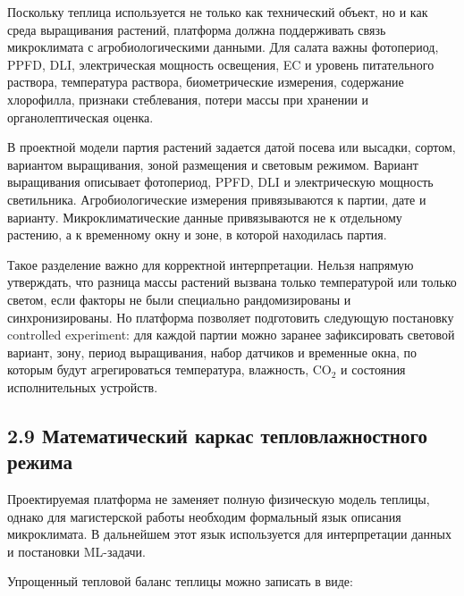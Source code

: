 \documentclass[a4paper,14pt]{extarticle}
\begin{document}
Поскольку теплица используется не только как технический объект, но и
как среда выращивания растений, платформа должна поддерживать связь
микроклимата с агробиологическими данными. Для салата важны фотопериод,
PPFD, DLI, электрическая мощность освещения, EC и уровень питательного
раствора, температура раствора, биометрические измерения, содержание
хлорофилла, признаки стеблевания, потери массы при хранении и
органолептическая оценка.

В проектной модели партия растений задается датой посева или высадки,
сортом, вариантом выращивания, зоной размещения и световым режимом.
Вариант выращивания описывает фотопериод, PPFD, DLI и электрическую
мощность светильника. Агробиологические измерения привязываются к
партии, дате и варианту. Микроклиматические данные привязываются не к
отдельному растению, а к временному окну и зоне, в которой находилась
партия.

Такое разделение важно для корректной интерпретации. Нельзя напрямую
утверждать, что разница массы растений вызвана только температурой или
только светом, если факторы не были специально рандомизированы и
синхронизированы. Но платформа позволяет подготовить следующую
постановку controlled experiment: для каждой партии можно заранее
зафиксировать световой вариант, зону, период выращивания, набор датчиков
и временные окна, по которым будут агрегироваться температура,
влажность, CO\(_2\) и состояния исполнительных устройств.

\hypertarget{ux43cux430ux442ux435ux43cux430ux442ux438ux447ux435ux441ux43aux438ux439-ux43aux430ux440ux43aux430ux441-ux442ux435ux43fux43bux43eux432ux43bux430ux436ux43dux43eux441ux442ux43dux43eux433ux43e-ux440ux435ux436ux438ux43cux430}{%
\subsection{2.9 Математический каркас тепловлажностного
режима}\label{ux43cux430ux442ux435ux43cux430ux442ux438ux447ux435ux441ux43aux438ux439-ux43aux430ux440ux43aux430ux441-ux442ux435ux43fux43bux43eux432ux43bux430ux436ux43dux43eux441ux442ux43dux43eux433ux43e-ux440ux435ux436ux438ux43cux430}}

Проектируемая платформа не заменяет полную физическую модель теплицы,
однако для магистерской работы необходим формальный язык описания
микроклимата. В дальнейшем этот язык используется для интерпретации
данных и постановки ML-задачи.

Упрощенный тепловой баланс теплицы можно записать в виде:
\end{document}
